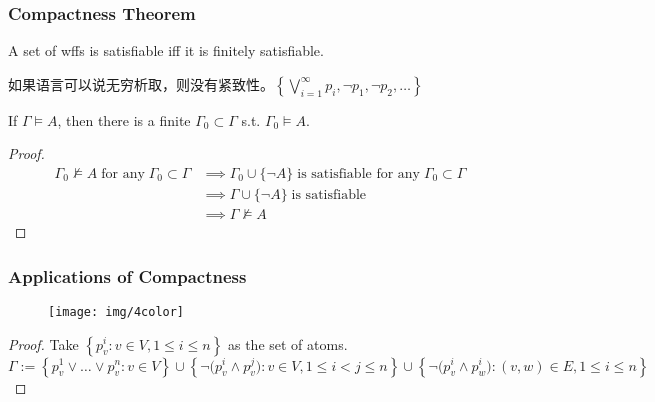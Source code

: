 \documentclass[UTF8,aspectratio=43,11pt,colorlinks,compress,openany]{beamer}%
\begin{document}
\begin{frame}\frametitle{Compactness Theorem}
\setlength\abovedisplayskip{0pt}
\setlength\belowdisplayskip{0pt}
	\begin{theorem}
		A set of wffs is satisfiable iff it is finitely satisfiable.
	\end{theorem}
	\begin{block}{}
	如果语言可以说无穷析取，则没有紧致性。$\left\{\bigvee\limits_{i=1}^\infty p_i,\neg p_1,\neg p_2,\dots\right\}$
	\end{block}
	\begin{corollary}
		If $\Gamma\vDash A$, then there is a finite $\Gamma_0\subset\Gamma$ s.t. $\Gamma_0\vDash A$.
	\end{corollary}
	\begin{proof}
		\begin{align*}
		\Gamma_0\nvDash A\;\text{for any}\;\Gamma_0\subset\Gamma&\implies\Gamma_0\cup\{\neg A\}\;\text{is satisfiable for any}\;\Gamma_0\subset\Gamma\\
		&\implies\Gamma\cup\{\neg A\}\;\text{is satisfiable}\\
		&\implies\Gamma\nvDash A
		\end{align*}
	\end{proof}
\end{frame}

\begin{frame}\frametitle{Applications of Compactness}
	\begin{figure}
	\texttt{[image: img/4color]}
	\end{figure}
	\begin{center}
	\end{center}
\begin{proof}
Take $\left\{p_v^i: v\in V, 1\leq i\leq n\right\}$ as the set of atoms.\\
$\Gamma:=\left\{p_v^1\vee\dots\vee p_v^n: v\in V\right\}\cup\left\{\neg\big(p_v^i\wedge p_v^j\big): v\in V, 1\leq i<j\leq n\right\}\cup\left\{\neg\big(p_v^i\wedge p_w^i\big): (v,w)\in E, 1\leq i\leq n\right\}$
\end{proof}
\end{frame}
\end{document}
